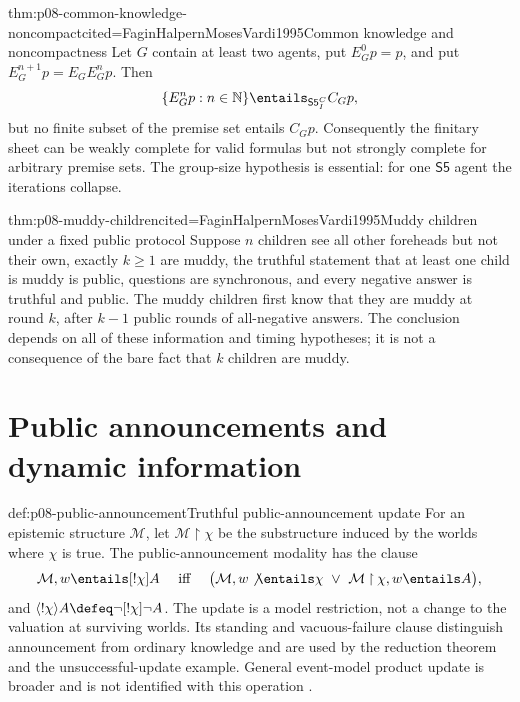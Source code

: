 \begin{hbtheorem}{thm:p08-common-knowledge-noncompact}{cited=FaginHalpernMosesVardi1995}{Common knowledge and noncompactness}
Let \(G\) contain at least two agents, put \(E_G^0p=p\), and put
\(E_G^{n+1}p=E_GE_G^np\).  Then
\[
 \{E_G^np:n\in\mathbb N\}\entails_{\mathsf{S5}_{I}^{C}} C_Gp,
\]
but no finite subset of the premise set entails \(C_Gp\).  Consequently the
finitary sheet can be weakly complete for valid formulas but not strongly
complete for arbitrary premise sets.  The group-size hypothesis is essential:
for one \(\mathsf{S5}\) agent the iterations collapse.
\end{hbtheorem}

\begin{hbtheorem}{thm:p08-muddy-children}{cited=FaginHalpernMosesVardi1995}{Muddy children under a fixed public protocol}
Suppose \(n\) children see all other foreheads but not their own, exactly
\(k\ge1\) are muddy, the truthful statement that at least one child is muddy is
public, questions are synchronous, and every negative answer is truthful and
public.  The muddy children first know that they are muddy at round \(k\),
after \(k-1\) public rounds of all-negative answers.  The conclusion depends on
all of these information and timing hypotheses; it is not a consequence of the
bare fact that \(k\) children are muddy.
\end{hbtheorem}

\section[Public announcements]{Public announcements and dynamic information}

\begin{hbdefinition}{def:p08-public-announcement}{Truthful public-announcement update}
For an epistemic structure \(\mathcal M\), let
\(\mathcal M\mathbin{\upharpoonright}\chi\) be the substructure induced by the worlds where
\(\chi\) is true.  The public-announcement modality has the clause
\[
 \mathcal M,w\entails[!\chi]A
 \quad\text{ iff }\quad
 \bigl(\mathcal M,w\not\entails\chi\ \lor\
       \mathcal M\mathbin{\upharpoonright}\chi,w\entails A\bigr),
\]
and \(\langle!\chi\rangle A\defeq\neg[!\chi]\neg A\).  The update is a
model restriction, not a change to the valuation at surviving worlds.  Its
standing and vacuous-failure clause distinguish announcement from ordinary
knowledge and are used by the reduction theorem and the unsuccessful-update
example.  General event-model product update is broader and is not identified
with this operation \cite{Plaza1989,BaltagMossSolecki1998}.
\end{hbdefinition}

